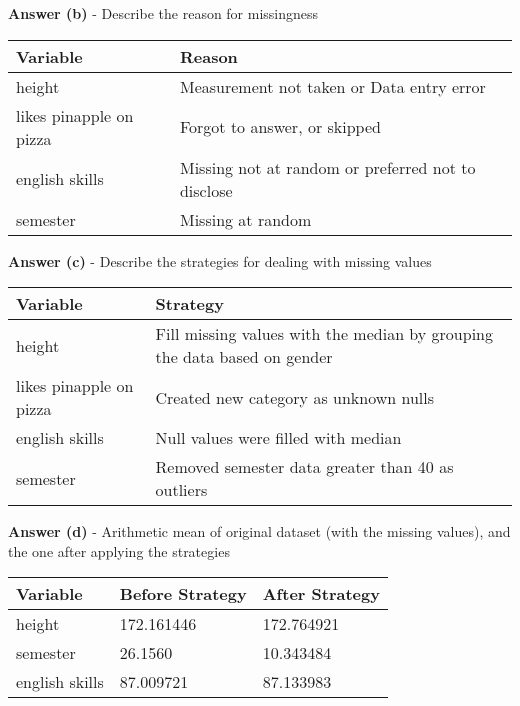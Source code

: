\documentclass[a4paper,10pt]{article}\setlength{\textheight}{10in}\setlength{\textwidth}{6.5in}\setlength{\topmargin}{-0.125in}\setlength{\oddsidemargin}{-.2in}\setlength{\evensidemargin}{-.2in}\setlength{\headsep}{0.2in}\setlength{\footskip}{0pt}\usepackage{amsmath}\usepackage{fancyhdr}\usepackage{enumitem}\usepackage{hyperref}\usepackage{xcolor}\usepackage{graphicx}\usepackage[export]{adjustbox}\usepackage{caption}\usepackage{float}\usepackage{booktabs}\usepackage{makecell}\pagestyle{fancy}
\begin{document}
\begin{enumerate}[topsep=0mm, partopsep=0mm, leftmargin=*]
\textbf{Answer (b)} - Describe the reason for missingness
\begin{center}
\begin{tabular}{ll}
\toprule
\textbf{Variable} & \textbf{Reason} \\ \midrule
height & Measurement not taken or Data entry error \\
likes pinapple on pizza  & Forgot to answer, or skipped \\
english skills & Missing not at random or preferred not to disclose \\
semester & Missing at random \\
\bottomrule
\end{tabular}
\end{center}

\textbf{Answer (c)} - Describe the strategies for dealing with missing values
\begin{center}
\begin{tabular}{ll}
\toprule
\textbf{Variable} & \textbf{Strategy} \\ \midrule
height & Fill missing values with the median by grouping the data based on gender \\
likes pinapple on pizza  & Created new category as unknown nulls \\
english skills & Null values were filled with median \\
semester & Removed semester data greater than 40 as outliers \\

\bottomrule
\end{tabular}
\end{center}

\textbf{Answer (d)} - Arithmetic mean of original dataset (with the missing values), and the one after applying the strategies
\begin{center}
\begin{tabular}{lll}
\toprule
\textbf{Variable} & \textbf{Before Strategy} & \textbf{After Strategy} \\ \midrule
height & 172.161446 & 172.764921 \\
semester & 26.1560 & 10.343484 \\
english skills & 87.009721 & 87.133983 \\

\bottomrule
\end{tabular}
\end{center}

\end{enumerate}
\end{document}
